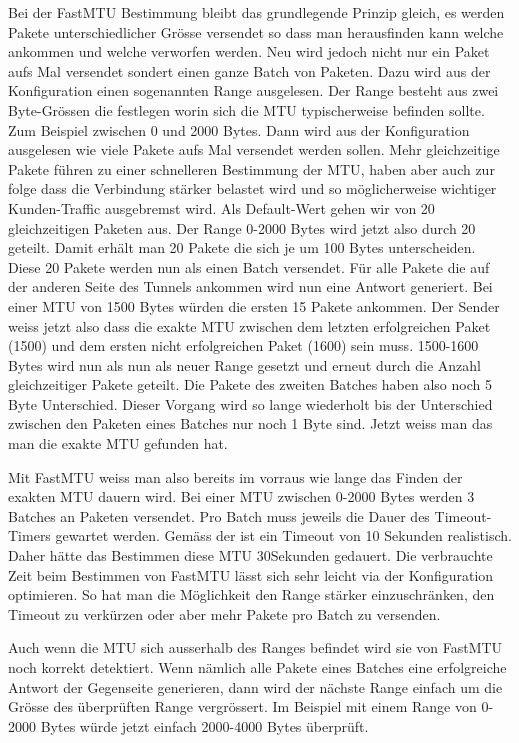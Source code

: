 Bei der FastMTU Bestimmung bleibt das grundlegende Prinzip gleich, es werden Pakete unterschiedlicher Grösse versendet so dass man herausfinden kann welche ankommen und welche verworfen werden. Neu wird jedoch nicht nur ein Paket aufs Mal versendet sondert einen ganze Batch von Paketen. Dazu wird aus der Konfiguration einen sogenannten Range ausgelesen. Der Range besteht aus zwei Byte-Grössen die festlegen worin sich die \acs{MTU} typischerweise befinden sollte. Zum Beispiel zwischen 0 und 2000 Bytes. Dann wird aus der Konfiguration ausgelesen wie viele Pakete aufs Mal versendet werden sollen. Mehr gleichzeitige Pakete führen zu einer schnelleren Bestimmung der \acs{MTU}, haben aber auch zur folge dass die Verbindung stärker belastet wird und so möglicherweise wichtiger Kunden-Traffic ausgebremst wird. Als Default-Wert gehen wir von 20 gleichzeitigen Paketen aus. Der Range 0-2000 Bytes wird jetzt also durch 20 geteilt. Damit erhält man 20 Pakete die sich je um 100 Bytes unterscheiden. Diese 20 Pakete werden nun als einen Batch versendet.
Für alle Pakete die auf der anderen Seite des Tunnels ankommen wird nun eine Antwort generiert. Bei einer MTU von 1500 Bytes würden die ersten 15 Pakete ankommen. Der Sender weiss jetzt also dass die exakte \acs{MTU} zwischen dem letzten erfolgreichen Paket (1500) und dem ersten nicht erfolgreichen Paket (1600) sein muss. 1500-1600 Bytes wird nun als nun als neuer Range gesetzt und erneut durch die Anzahl gleichzeitiger Pakete geteilt. Die Pakete des zweiten Batches haben also noch 5 Byte Unterschied. Dieser Vorgang wird so lange wiederholt bis der Unterschied zwischen den Paketen eines Batches nur noch 1 Byte sind. Jetzt weiss man das man die exakte \acs{MTU} gefunden hat.

Mit FastMTU weiss man also bereits im vorraus wie lange das Finden der exakten \acs{MTU} dauern wird. Bei einer MTU zwischen 0-2000 Bytes werden 3 Batches an Paketen versendet. Pro Batch muss jeweils die Dauer des Timeout-Timers gewartet werden. Gemäss der \osag ist ein Timeout von 10 Sekunden realistisch. Daher hätte das Bestimmen diese \acs{MTU} 30Sekunden gedauert.
Die verbrauchte Zeit beim Bestimmen von FastMTU lässt sich sehr leicht via der Konfiguration optimieren. So hat man die Möglichkeit den Range stärker einzuschränken, den Timeout zu verkürzen oder aber mehr Pakete pro Batch zu versenden.


Auch wenn die \acs{MTU} sich ausserhalb des Ranges befindet wird sie von FastMTU noch korrekt detektiert. Wenn nämlich alle Pakete eines Batches eine erfolgreiche Antwort der Gegenseite generieren, dann wird der nächste Range einfach um die Grösse des überprüften Range vergrössert. Im Beispiel mit einem Range von 0-2000 Bytes würde jetzt einfach 2000-4000 Bytes überprüft.